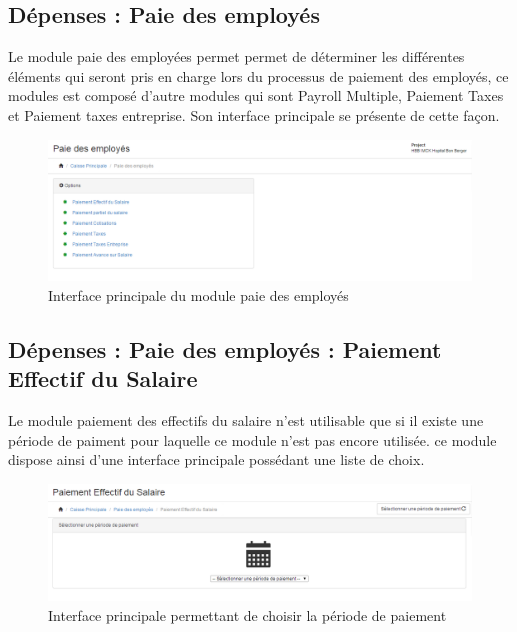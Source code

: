 \documentclass[12pt,a4paper]{report}
\begin{document}
\subsection{Dépenses : Paie des employés}
Le module paie des employées permet permet de déterminer les différentes éléments qui seront pris en charge lors du processus de paiement des employés, ce modules est composé d'autre modules qui sont Payroll Multiple, Paiement Taxes et Paiement taxes entreprise. Son interface principale se présente de cette façon.


\begin{figure}[h]
\begin{center}
\includegraphics[width=16cm]{pic/paieEmp.png}
\end{center}
\caption{Interface principale du module paie des employés}
\label{Interface principale du module paie des employés}
\end{figure}


\subsection{Dépenses : Paie des employés : Paiement Effectif du Salaire}
Le module paiement des effectifs du salaire n'est utilisable que si il existe une période de paiment pour laquelle ce module n'est pas encore utilisée. ce module dispose ainsi d'une interface principale possédant une liste de choix.

\begin{figure}[h]
\begin{center}
\includegraphics[width=14cm]{pic/selectPeriodPaiSal.png}
\end{center}
\caption{Interface principale permettant de choisir la période de paiement }
\label{Interface principale permettant de choisir la période de paiement }
\end{figure}
\end{document}
